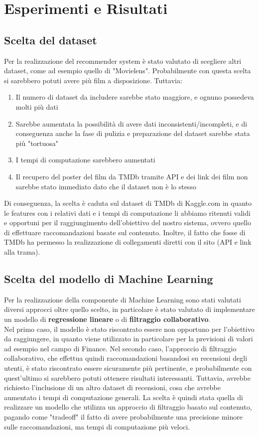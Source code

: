 \documentclass{report}
\begin{document}
\chapter{Esperimenti e Risultati}
    \section{Scelta del dataset}
        Per la realizzazione del recommender system è stato valutato di scegliere altri dataset, come ad esempio quello di "Movielens". Probabilmente con questa scelta si sarebbero potuti avere più film a disposizione. Tuttavia:
        \begin{enumerate}
            \item Il numero di dataset da includere sarebbe stato maggiore, e ognuno possedeva molti più dati
            \item Sarebbe aumentata la possibilità di avere dati inconsistenti/incompleti, e di conseguenza anche la fase di pulizia e preparazione del dataset sarebbe stata più "tortuosa"
            \item I tempi di computazione sarebbero aumentati
            \item Il recupero del poster del film da TMDb tramite API e dei link dei film non sarebbe stato immediato dato che il dataset non è lo stesso
        \end{enumerate}
        Di conseguenza, la scelta è caduta sul dataset di TMDb di Kaggle.com in quanto le features con i relativi dati e i tempi di computazione li abbiamo ritenuti validi e opportuni per il raggiungimento dell'obiettivo del nostro sistema, ovvero quello di effettuare raccomandazioni basate sul contenuto. Inoltre, il fatto che fosse di TMDb ha permesso la realizzazione di collegamenti diretti con il sito (API e link alla trama).
    \section{Scelta del modello di Machine Learning}
        Per la realizzazione della componente di Machine Learning sono stati valutati diversi approcci oltre quello scelto, in particolare è stato valutato di implementare un modello di \textbf{regressione lineare} o di \textbf{filtraggio collaborativo}. \\
        Nel primo caso, il modello è stato riscontrato essere non opportuno per l'obiettivo da raggiungere, in quanto viene utilizzato in particolare per la previsioni di valori ad esempio nel campo di Finance. Nel secondo caso, l'approccio di filtraggio collaborativo, che effettua quindi raccomandazioni basandosi su recensioni degli utenti, è stato riscontrato essere sicuramente più pertinente, e probabilmente con quest'ultimo si sarebbero potuti ottenere risultati interessanti. Tuttavia, avrebbe richiesto l'inclusione di un altro dataset di recensioni, cosa che avrebbe aumentato i tempi di computazione generali. La scelta è quindi stata quella di realizzare un modello che utilizza un approccio di filtraggio basato sul contenuto, pagando come "tradeoff" il fatto di avere probabilmente una precisione minore sulle raccomandazioni, ma tempi di computazione più veloci.
\end{document}
